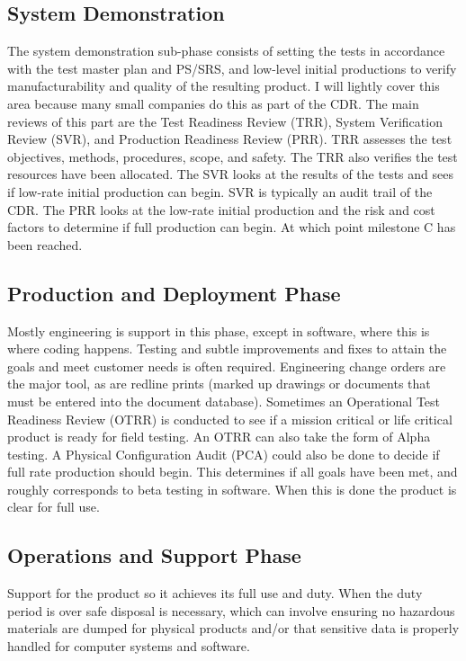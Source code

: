 \subsection{System Demonstration}
The system demonstration sub-phase consists of setting the tests in accordance with the test master plan and PS/SRS, and low-level initial productions to verify manufacturability and quality of the resulting product.  I will lightly cover this area because many small companies do this as part of the CDR.  The main reviews of this part are the Test Readiness Review (TRR), System Verification Review (SVR), and Production Readiness Review (PRR).  TRR assesses the test objectives, methods, procedures, scope, and safety.  The TRR also verifies the test resources have been allocated.  The SVR looks at the results of the tests and sees if low-rate initial production can begin. SVR is typically an audit trail of the CDR.  The PRR looks at the low-rate initial production and the risk and cost factors to determine if full production can begin.  At which point milestone C has been reached.



\subsection{Production and Deployment Phase}
Mostly engineering is support in this phase, except in software, where this is where coding happens.  Testing and subtle improvements and fixes to attain the goals and meet customer needs is often required.  Engineering change orders are the major tool, as are redline prints (marked up drawings or documents that must be entered into the document database).  Sometimes an Operational Test Readiness Review (OTRR) is conducted to see if a mission critical or life critical product is ready for field testing.  An OTRR can also take the form of Alpha testing.  A Physical Configuration Audit (PCA) could also be done to decide if full rate production should begin.  This determines if all goals have been met, and roughly corresponds to beta testing in software.  When this is done the product is clear for full use.

\subsection{Operations and Support Phase}
Support for the product so it achieves its full use and duty.  When the duty period is over safe disposal is necessary, which can involve ensuring no hazardous materials are dumped for physical products and/or that sensitive data is properly handled for computer systems and software.


